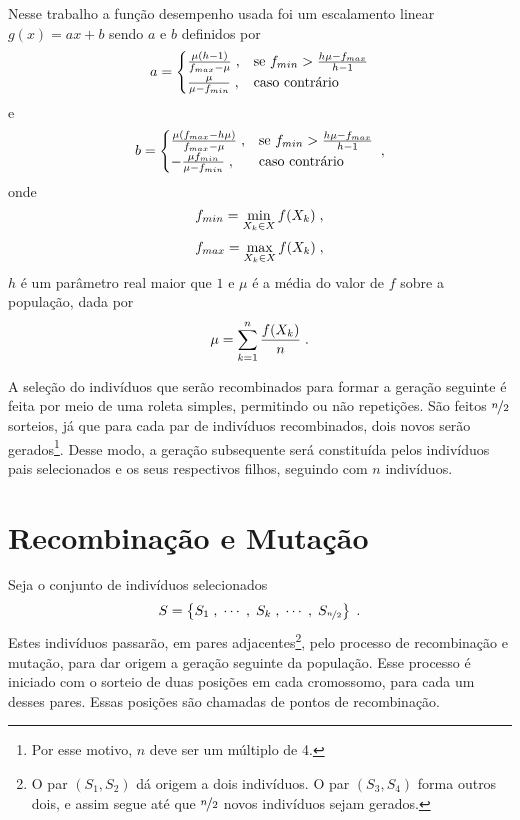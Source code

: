 Nesse trabalho a função desempenho usada foi um escalamento linear \cite{goldberg1989ga} $ g(x) = ax + b $
sendo $a$ e $b$ definidos por
\begin{equation}
  a =
  \begin{cases}
    \frac{\mu (h - 1)}{f_{max} - \mu} \;, & \text{se } f_{min} > \frac{h\mu - f_{max}}{h - 1} \\
    \frac{\mu}{\mu - f_{min}}         \;, & \text{caso contrário}
  \end{cases}
  \label{eq:linear_fit_a}
\end{equation}
e
\begin{equation}
  b =
  \begin{cases}
    \frac{\mu (f_{max} - h\mu)}{f_{max} - \mu} \;, & \text{se } f_{min} > \frac{h\mu - f_{max}}{h - 1} \\
    - \frac{\mu f_{min}}{\mu - f_{min}}         \;, & \text{caso contrário}
  \end{cases}
  \;\mathrm{,}
  \label{eq:linear_fit_b}
\end{equation}
onde
\begin{equation}
  f_{min} = \min_{X_k \in X} f(X_k) \;\mathrm{,}
\end{equation}
\begin{equation}
  f_{max} = \max_{X_k \in X} f(X_k) \;\mathrm{,}
\end{equation}
$h$ é um parâmetro real maior que $1$ e $\mu$ é a média do valor de $f$ sobre a população, dada por
\begin{equation}
  \mu = \sum_{k = 1}^n \frac{f(X_k)}{n} \;\mathrm{.}
\end{equation}

A seleção do indivíduos que serão recombinados para formar a geração seguinte é feita por meio
de uma roleta simples, permitindo ou não repetições. São feitos $ \nicefrac{n}{2} $ sorteios,
já que para cada par de indivíduos recombinados, dois novos serão gerados\footnote{
  Por esse motivo, $n$ deve ser um múltiplo de 4.
}.
Desse modo, a geração subsequente será constituída pelos indivíduos pais selecionados e os seus
respectivos filhos, seguindo com $n$ indivíduos.

\section{Recombinação e Mutação}

Seja o conjunto de indivíduos selecionados
\begin{equation}
  S = \left\{ S_1\;, \;\cdots\;,  \;S_k\;, \;\cdots\;, \;S_{\nicefrac{n}{2}} \right\} \;\mathrm{.}
  \label{eq:selection}
\end{equation}
Estes indivíduos passarão, em pares adjacentes\footnote{
  O par $ (S_1, S_2) $ dá origem a dois indivíduos. O par $ (S_3, S_4) $ forma outros dois, e assim segue
  até que $ \nicefrac{n}{2} $ novos indivíduos sejam gerados.
}, pelo processo de recombinação e mutação, para dar origem a
geração seguinte da população. Esse processo é iniciado com o sorteio de duas posições em cada cromossomo,
para cada um desses pares. Essas posições são chamadas de pontos de recombinação.

